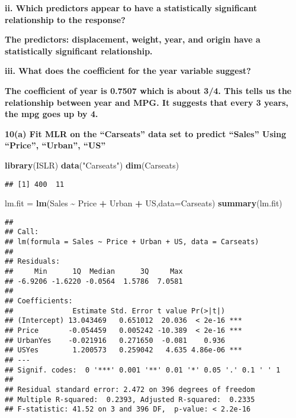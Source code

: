 \documentclass[
]{article}
\newenvironment{Shaded}{\begin{snugshade}}{\end{snugshade}}
\newcommand{\AttributeTok}[1]{\textcolor[rgb]{0.13,0.29,0.53}{#1}}
\newcommand{\FunctionTok}[1]{\textcolor[rgb]{0.13,0.29,0.53}{\textbf{#1}}}
\newcommand{\NormalTok}[1]{#1}
\newcommand{\OtherTok}[1]{\textcolor[rgb]{0.56,0.35,0.01}{#1}}
\newcommand{\SpecialCharTok}[1]{\textcolor[rgb]{0.81,0.36,0.00}{\textbf{#1}}}
\newcommand{\StringTok}[1]{\textcolor[rgb]{0.31,0.60,0.02}{#1}}
\begin{document}
\textbf{ii. Which predictors appear to have a statistically significant
relationship to the response?}

\textbf{The predictors: displacement, weight, year, and origin have a
statistically significant relationship.}

\textbf{iii. What does the coefficient for the year variable suggest?}

\textbf{The coefficient of year is 0.7507 which is about 3/4. This tells
us the relationship between year and MPG. It suggests that every 3
years, the mpg goes up by 4.}

\textbf{10(a) Fit MLR on the ``Carseats'' data set to predict ``Sales''
Using ``Price'', ``Urban'', ``US''}

\begin{Shaded}
\begin{Highlighting}[]
\FunctionTok{library}\NormalTok{(ISLR)}
\FunctionTok{data}\NormalTok{(}\StringTok{"Carseats"}\NormalTok{)}
\FunctionTok{dim}\NormalTok{(Carseats)}
\end{Highlighting}
\end{Shaded}

\begin{verbatim}
## [1] 400  11
\end{verbatim}

\begin{Shaded}
\begin{Highlighting}[]
\NormalTok{lm.fit }\OtherTok{=} \FunctionTok{lm}\NormalTok{(Sales }\SpecialCharTok{\textasciitilde{}}\NormalTok{ Price }\SpecialCharTok{+}\NormalTok{ Urban }\SpecialCharTok{+}\NormalTok{ US,}\AttributeTok{data=}\NormalTok{Carseats)}
\FunctionTok{summary}\NormalTok{(lm.fit)}
\end{Highlighting}
\end{Shaded}

\begin{verbatim}
## 
## Call:
## lm(formula = Sales ~ Price + Urban + US, data = Carseats)
## 
## Residuals:
##     Min      1Q  Median      3Q     Max 
## -6.9206 -1.6220 -0.0564  1.5786  7.0581 
## 
## Coefficients:
##              Estimate Std. Error t value Pr(>|t|)    
## (Intercept) 13.043469   0.651012  20.036  < 2e-16 ***
## Price       -0.054459   0.005242 -10.389  < 2e-16 ***
## UrbanYes    -0.021916   0.271650  -0.081    0.936    
## USYes        1.200573   0.259042   4.635 4.86e-06 ***
## ---
## Signif. codes:  0 '***' 0.001 '**' 0.01 '*' 0.05 '.' 0.1 ' ' 1
## 
## Residual standard error: 2.472 on 396 degrees of freedom
## Multiple R-squared:  0.2393, Adjusted R-squared:  0.2335 
## F-statistic: 41.52 on 3 and 396 DF,  p-value: < 2.2e-16
\end{verbatim}
\end{document}
